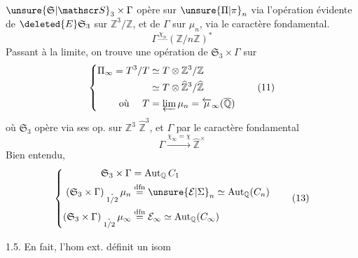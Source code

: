  $\unsure{\mathfrak S|\mathscr S}_3\times\Gamma$ opère sur $\unsure{\Pi|\pi}_n$ via l'opération
évidente de $\deleted{E}\mathfrak S_3$ sur $\mathbb Z^3/\mathbb Z$, et de $\Gamma$
sur $\mu_n$, via le caractère fondamental.
\[
\Gamma\mathrel{\overset{\chi_n}{\text{---}}}(\mathbb Z/n\mathbb Z)^*\tag*{(10)}
\]
Passant à la limite, on trouve une opération
de $\mathfrak S_3\times\Gamma$ sur
\[
\left\{\begin{aligned}
\Pi_\infty=T^3/T&\simeq T\otimes\mathbb Z^3/\mathbb Z\\
&\simeq T\otimes\widehat{\mathbb Z}^3/\widehat{\mathbb Z}\\
\text{où }\quad T&=\varprojlim\mu_n=\overleftarrow{\mu}_\infty(\overline{\mathbb Q})
\end{aligned}\right.\tag*{(11)}
\]
où $\mathfrak S_3$ opère via ses op. sur $\mathbb Z^3$  $\widehat{\mathbb Z}^3$,
et $\Gamma$ par le caractère fondamental
\[
\Gamma\xrightarrow{\chi_\infty=\chi}\widehat{\mathbb Z}^{\times}\tag*{(12)}
\]
Bien entendu,
\[
\left\{\begin{aligned}
\mathfrak S_3\times\Gamma&=\operatorname{Aut}_{\mathbb Q}C_1\\
(\mathfrak S_3\times\Gamma)\underset{1/2}{\mathbin{.}}\mu_n&\overset{\mathrm{dfn}}{=}\unsure{\mathcal E|\Sigma}_n\simeq\operatorname{Aut}_{\mathbb Q}(C_n)\\
(\mathfrak S_3\times\Gamma)\underset{1/2}{\mathbin{.}}\mu_\infty&\overset{\mathrm{dfn}}{=}\mathcal E_\infty\simeq\operatorname{Aut}_{\mathbb Q}(C_\infty)
\end{aligned}\right.\tag*{(13)}
\]

1.5. En fait, l'hom ext.
définit un isom
